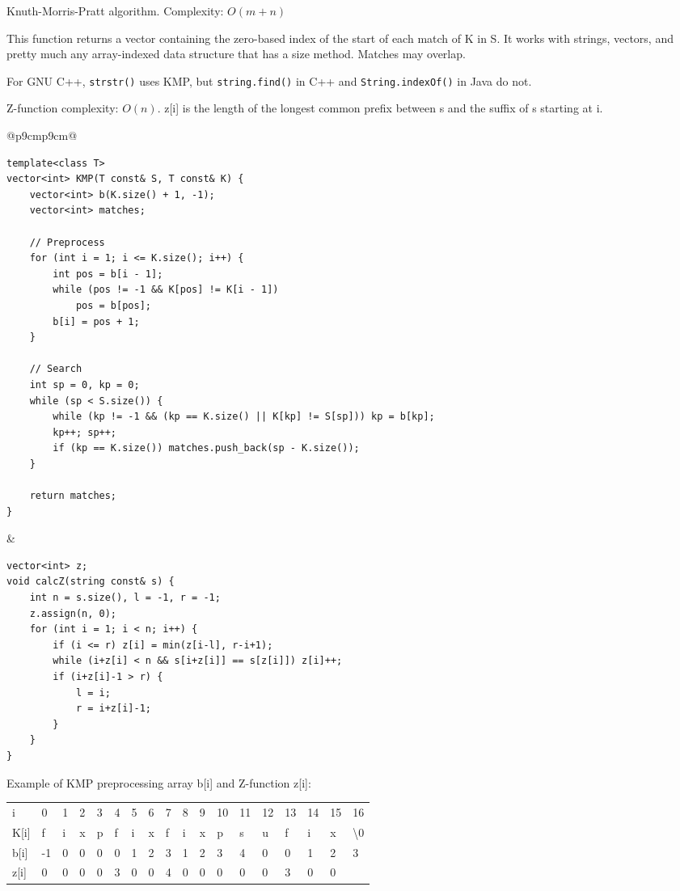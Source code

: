 \documentclass[letterpaper]{article}
\begin{document}
Knuth-Morris-Pratt algorithm. Complexity: $O\left(m+n\right)$

This function returns a vector containing the zero-based index of the start of each match of K in S. It works with strings, vectors, and pretty much any array-indexed data structure that has a size method. Matches may overlap.

For GNU C++, \texttt{strstr()} uses KMP, but \texttt{string.find()} in C++ and \texttt{String.indexOf()} in Java do not.

Z-function complexity: $O\left(n\right)$. z[i] is the length of the longest common prefix between s and the suffix of s starting at i.
\begin{tabular}{@{}p{9cm}p{9cm}@{}}
\begin{lstlisting}
template<class T>
vector<int> KMP(T const& S, T const& K) {
	vector<int> b(K.size() + 1, -1);
	vector<int> matches;

	// Preprocess
	for (int i = 1; i <= K.size(); i++) {
		int pos = b[i - 1];
		while (pos != -1 && K[pos] != K[i - 1])
			pos = b[pos];
		b[i] = pos + 1;
	}

	// Search
	int sp = 0, kp = 0;
	while (sp < S.size()) {
		while (kp != -1 && (kp == K.size() || K[kp] != S[sp])) kp = b[kp];
		kp++; sp++;
		if (kp == K.size()) matches.push_back(sp - K.size());
	}

	return matches;
}
\end{lstlisting}
&
\begin{lstlisting}
vector<int> z;
void calcZ(string const& s) {
	int n = s.size(), l = -1, r = -1;
	z.assign(n, 0);
	for (int i = 1; i < n; i++) {
		if (i <= r) z[i] = min(z[i-l], r-i+1);
		while (i+z[i] < n && s[i+z[i]] == s[z[i]]) z[i]++;
		if (i+z[i]-1 > r) {
			l = i;
			r = i+z[i]-1;
		}
	}
}
\end{lstlisting}
\end{tabular}

Example of KMP preprocessing array b[i] and Z-function z[i]:

{
\fontfamily{\ttdefault}\selectfont
\begin{tabular}{llllllllllllllllll}
i    & 0 & 1 & 2 & 3 & 4 & 5 & 6 & 7 & 8 & 9 & 10&11 &12 &13 &14 &15 &16 \\
K[i] & f & i & x & p & f & i & x & f & i & x & p & s & u & f & i & x &\textbackslash 0 \\
b[i] & -1& 0 & 0 & 0 & 0 & 1 & 2 & 3 & 1 & 2 & 3 & 4 & 0 & 0 & 1 & 2 & 3 \\
z[i] & 0& 0 & 0 & 0 & 3 & 0 & 0 & 4 & 0 & 0 & 0 & 0 & 0 & 3 & 0 & 0 &
\end{tabular}
}
\end{document}
